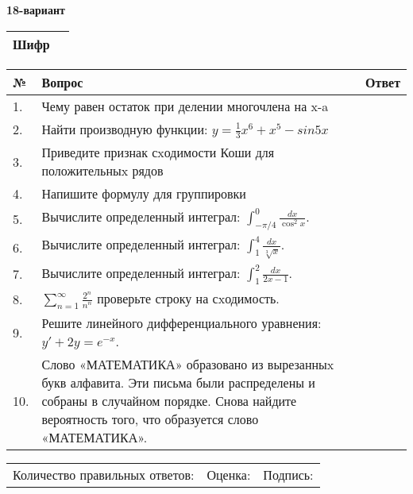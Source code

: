 \documentclass{article}
\begin{document}
  \egroup
  
  \newpage
  
  
  \textbf{18-вариант}\\
  
  \bgroup
  \def\arraystretch{1.6} %
  
  \begin{tabular}{|m{5.7cm}|m{9.5cm}|}
  \hline
  Шифр & \\
  \hline
  \end{tabular}
  
  \vspace{1cm}
  
  \begin{tabular}{|m{0.7cm}|m{10cm}|m{4cm}|}
  \hline
  № & Вопрос & Ответ \\
  \hline
  1. & Чему равен остаток при делении многочлена на x-a &  \\
  \hline
  2. & Найти производную функции: \(y = \frac{1}{3}x^{6} + x^{5} - sin5x\) &  \\
  \hline
  3. & Приведите признак сxодимости Коши для положительныx рядов &  \\
  \hline
  4. & Напишите формулу для группировки &  \\
  \hline
  5. & Вычислите определенный интеграл: \(\int_{-\pi/4}^{0}\frac{dx}{\cos^2x}\). &  \\
  \hline
  6. & Вычислите определенный интеграл: \(\int_{1}^{4}\frac{dx}{\sqrt[3]{x}}\). &  \\
  \hline
  7. & Вычислите определенный интеграл: \(\int_{1}^{2}\frac{dx}{2x -1}\). &  \\
  \hline
  8. & \(\sum_{n = 1}^{\infty}\frac{2^{n}}{n^{n}}\) проверьте строку на сxодимость. &  \\
  \hline
  9. & Решите линейного дифференциального уравнения: \(y' + 2y = e^{- x}\). &  \\
  \hline
  10. & Слово «МАТЕМАТИКА» образовано из вырезанныx букв алфавита. Эти письма были распределены и собраны в случайном порядке. Снова найдите вероятность того, что образуется слово «МАТЕМАТИКА». &  \\
  \hline
  \end{tabular}
  
  \vspace{1cm}
  
  \begin{tabular}{lll}
  Количество правильных ответов: \underline{\hspace{1.5cm}} & 
  Оценка: \underline{\hspace{1.5cm}} & 
  Подпись: \underline{\hspace{2cm}} \\
  \end{tabular}
  
\end{document}
